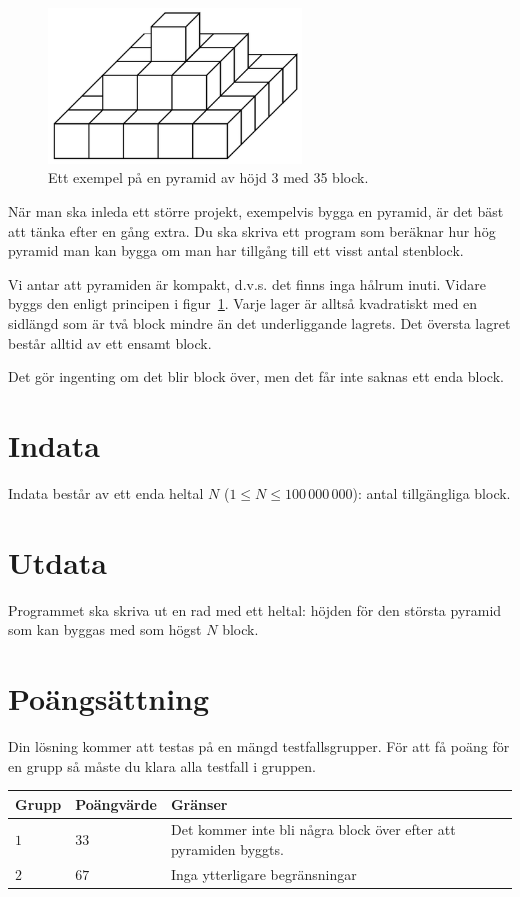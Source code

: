 
\begin{figure}[h!]
\centering
    \includegraphics[width=0.6\textwidth]{pyramid.png}
  \caption{Ett exempel på en pyramid av höjd 3 med 35 block.}
\label{fig:pyramid}
\end{figure}

När man ska inleda ett större projekt, exempelvis bygga en pyramid, är det bäst att tänka efter en gång extra.
Du ska skriva ett program som beräknar hur hög pyramid man kan bygga om man har tillgång till ett visst antal stenblock.

Vi antar att pyramiden är kompakt, d.v.s. det finns inga hålrum inuti.
Vidare byggs den enligt principen i figur~\ref{fig:pyramid}.
Varje lager är alltså kvadratiskt med en sidlängd som är två block mindre än det underliggande lagrets.
Det översta lagret består alltid av ett ensamt block.

Det gör ingenting om det blir block över, men det får inte saknas ett enda block.

\section*{Indata}
Indata består av ett enda heltal $N$ ($1 \le N \le 100\,000\,000$): antal tillgängliga block.

\section*{Utdata}
Programmet ska skriva ut en rad med ett heltal: höjden för den största pyramid som kan byggas med som högst $N$ block.

\section*{Poängsättning}
Din lösning kommer att testas på en mängd testfallsgrupper.
För att få poäng för en grupp så måste du klara alla testfall i gruppen.

\noindent
\begin{tabular}{| l | l | l |}
  \hline
  Grupp & Poängvärde & Gränser \\ \hline
  $1$    & $33$        &  Det kommer inte bli några block över efter att pyramiden byggts. \\ \hline
  $2$    & $67$        &  Inga ytterligare begränsningar \\ \hline
\end{tabular}
